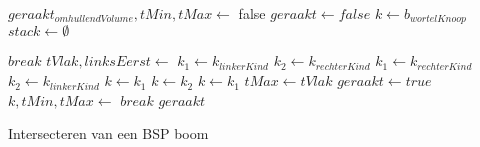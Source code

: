 \begin{dutchalgorithm}
    \begin{algorithmic}       
            \State $geraakt_{omhullendVolume}, tMin, tMax \gets $ 
                \State \Return false
            \EndIf
            \State $geraakt \gets false$
            \State $k \gets b_{wortelKnoop}$
            \State $stack\gets \emptyset$

                    \State $break$
                \EndIf
                    \State $tVlak, linksEerst \gets$ 
                        \State $k_1 \gets k_{linkerKind}$
                        \State $k_2 \gets k_{rechterKind}$
                    \Else
                        \State $k_1 \gets k_{rechterKind}$
                        \State $k_2 \gets k_{linkerKind}$
                    \EndIf
                        \State $k \gets k_1$
                        \State $k \gets k_2$
                    \Else
                        \State {}
                        \State $k \gets k_1$
                        \State $tMax \gets tVlak$ 
                    \EndIf
                \Else
                        \State $geraakt \gets true$
                    \EndIf
                        \State $k, tMin, tMax \gets $
                    \Else
                        \State $break$
                    \EndIf
                \EndIf
            \EndWhile
            \State \Return $geraakt$
        \EndFunction
    \end{algorithmic}
    \caption{Intersecteren van een BSP boom}
    \label{alg:bsp-intersectie}

\end{dutchalgorithm}  

